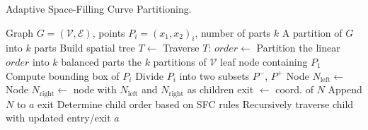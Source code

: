 \begin{algorithm}
    \caption{Adaptive Space-Filling Curve Partitioning.}
    \label{alg:adaptive_sfc}
    \begin{algorithmic}[1]
        \Require Graph \( G = (\mathcal{V}, \mathcal{E}) \), points \( P_i = (x_{1}, x_{2})_i \), number of parts \(k\)
        \Ensure A partition of \( G \) into \( k \) parts
            \State Build spatial tree \(T \gets\) 
            \State Traverse \(T\): \(order \gets\) 
            \State Partition the linear \(order\) into \(k\) balanced parts
            \State \Return the \(k\) partitions of \(\mathcal{V}\)
        \EndFunction
                \State \Return leaf node containing \(P_1\)
            \Else
                \State Compute bounding box of \(P_i\)
                \State Divide \(P_i\) into two subsets \(P^-\), \(P^+\)
                \State Node \(N_{\text{left}} \gets\) 
                \State Node \(N_{\text{right}} \gets\) 
                \State \Return node with \(N_{\text{left}}\) and \(N_{\text{right}}\) as children
            \EndIf
        \EndFunction
                \State exit \(\gets\) coord. of \(N\)
                \State Append \(N\) to \(a\)
                \State \Return exit
            \Else
                \State Determine child order based on SFC rules
                    \State Recursively traverse child with updated entry/exit
                \EndFor
                \State \Return \(a\)
            \EndIf
        \EndFunction
    \end{algorithmic}
\end{algorithm}